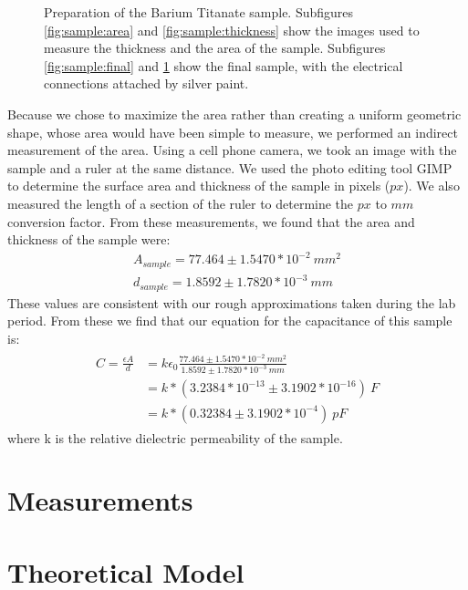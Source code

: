 \documentclass[%
 reprint,
 amsmath,amssymb,
 aps,
 pra,
]{revtex4-1}
\begin{document}
\begin{figure}[H]
\begin{subfigure}{0.22\textwidth}
		\caption{}
		\label{fig:sample:inplace}
	\end{subfigure}
	\caption{Preparation of the Barium Titanate sample. Subfigures \ref{fig:sample:area} and \ref{fig:sample:thickness} show the images used to measure the thickness and the area of the sample. Subfigures \ref{fig:sample:final} and \ref{fig:sample:inplace} show the final sample, with the electrical connections attached by silver paint.}
	\label{fig:sample}
\end{figure}

Because we chose to maximize the area rather than creating a uniform geometric shape, whose area would have been simple to measure, we performed an indirect measurement of the area. Using a cell phone camera, we took an image with the sample and a ruler at the same distance. We used the photo editing tool GIMP to determine the surface area and thickness of the sample in pixels ($px$). We also measured the length of a section of the ruler to determine the $px$ to $mm$ conversion factor. From these measurements, we found that the area and thickness of the sample were:
\begin{gather}
	A_{sample} = 77.464 \pm 1.5470*10^{-2} ~mm^2  \nonumber \\
	d_{sample} = 1.8592 \pm 1.7820*10^{-3} ~mm	 \nonumber
\end{gather}
These values are consistent with our rough approximations taken during the lab period. From these we find that our equation for the capacitance of this sample is:
\begin{gather}
	\begin{align}
		C = \frac{\epsilon A}{d} & = k \epsilon_0 \frac{77.464 \pm 1.5470*10^{-2} ~mm^2}{1.8592 \pm 1.7820*10^{-3} ~mm} \nonumber \\
		& = k*(3.2384*10^{-13} \pm 3.1902*10^{-16})~F \nonumber \\
		& = k*(0.32384 \pm 3.1902*10^{-4})~pF \nonumber
	\end{align}
\end{gather}
where k is the relative dielectric permeability of the sample. 

\section{Measurements}

\section{Theoretical Model}
\end{document}
